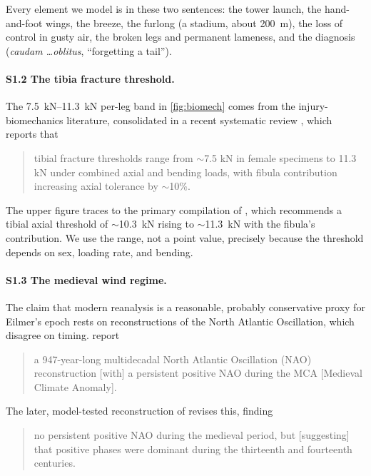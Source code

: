\noindent Every element we model is in these two sentences: the tower launch, the
hand-and-foot wings, the breeze, the furlong (a stadium, about \SI{200}{\meter}),
the loss of control in gusty air, the broken legs and permanent lameness, and the
diagnosis (\textit{caudam \ldots oblitus}, ``forgetting a tail'').

\paragraph{S1.2 The tibia fracture threshold.}
The \SIrange{7.5}{11.3}{\kilo\newton} per-leg band in \cref{fig:biomech} comes from
the injury-biomechanics literature, consolidated in a recent systematic review
\autocite{abidin2026tibia}, which reports that

\begin{quote}\small
tibial fracture thresholds range from \(\sim\)7.5 kN in female specimens to 11.3 kN
under combined axial and bending loads, with fibula contribution increasing axial
tolerance by \(\sim\)10\%.
\end{quote}

\noindent The upper figure traces to the primary compilation of
\textcite{salzar2014leg}, which recommends a tibial axial threshold of
\(\sim\)\SI{10.3}{\kilo\newton} rising to \(\sim\)\SI{11.3}{\kilo\newton} with the
fibula's contribution. We use the range, not a point value, precisely because the
threshold depends on sex, loading rate, and bending.

\paragraph{S1.3 The medieval wind regime.}
The claim that modern reanalysis is a reasonable, probably conservative proxy for
Eilmer's epoch rests on reconstructions of the North Atlantic Oscillation, which
disagree on timing. \textcite{trouet2009nao} report

\begin{quote}\small
a 947-year-long multidecadal North Atlantic Oscillation (NAO) reconstruction [with]
a persistent positive NAO during the MCA [Medieval Climate Anomaly].
\end{quote}

\noindent The later, model-tested reconstruction of \textcite{ortega2015nao}
revises this, finding

\begin{quote}\small
no persistent positive NAO during the medieval period, but [suggesting] that
positive phases were dominant during the thirteenth and fourteenth centuries.
\end{quote}


